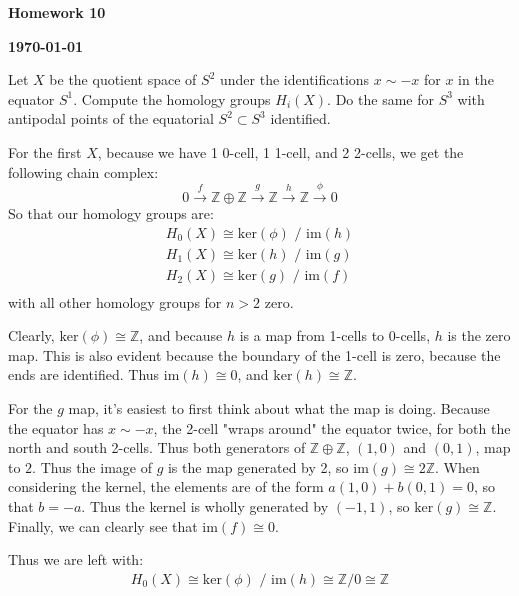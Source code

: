 \documentclass[12pt]{article}
\newcommand{\Z}{\mathbb{Z}}
\begin{document}
\begin{newtitle}
  \begin{center}
    \textbf{\Huge Homework 10}
  \end{center}
  \textbf{} \hfill \textbf{\today}
\end{newtitle}

\begin{statement}[2.2.10]
  Let $X$ be the quotient space of $S^2$ under the identifications $x \sim -x$ for $x$ in the equator $S^1$. Compute 
  the homology groups $H_i(X)$. Do the same for $S^3$ with antipodal points of the equatorial $S^2 \subset S^3$ 
  identified. 
\end{statement}
\begin{newproof}
  For the first $X$, because we have 1 0-cell, 1 1-cell, and 2 2-cells, we get the following chain complex: 
  $$ 0 \xrightarrow{f} \Z \oplus \Z \xrightarrow{g} \Z \xrightarrow{h} \Z \xrightarrow{\phi} 0 $$
  So that our homology groups are:
  \begin{align*}
    H_0(X) \cong \text{ker}(\phi) \text{ / im}(h) \\
    H_1(X) \cong \text{ker}(h) \text{ / im}(g) \\
    H_2(X) \cong \text{ker}(g) \text{ / im}(f) \\
  \end{align*}
  with all other homology groups for $n > 2$ zero.
  \par Clearly, $\text{ker}(\phi) \cong \Z$, and because $h$ is a map from 1-cells to 0-cells, $h$ is the zero map. This is also 
  evident because the boundary of the 1-cell is zero, because the ends are identified. Thus $\text{im}(h) \cong 0$, and 
  $\text{ker}(h) \cong \Z$. 
  \par For the $g$ map, it's easiest to first think about what the map is doing. Because the equator has $x \sim-x$, 
  the 2-cell "wraps around" the equator twice, for both the north and south 2-cells. Thus both generators of $\Z \oplus \Z$, $(1,0)$ 
  and $(0,1)$, map to $2$. Thus the image of $g$ is the map generated by 2, so $\text{im}(g) \cong 2\Z$. When considering the kernel, 
  the elements are of the form $a(1,0)+b(0,1) = 0$, so that $b=-a$. Thus the kernel is wholly generated by $(-1,1)$, so 
  $\text{ker}(g) \cong \Z$. Finally, we can clearly see that $\text{im}(f) \cong 0$. 
  \par Thus we are left with:
  \begin{align*}
    H_0(X) \cong \text{ker}(\phi) \text{ / im}(h) \cong \Z / 0 \cong \Z \\

\end{align*}
\end{newproof}
\end{document}
